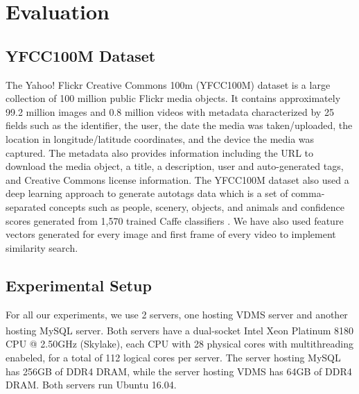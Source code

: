 \section{Evaluation}
\label{eval}

\subsection{YFCC100M Dataset}
\label{dataset}

The Yahoo! Flickr Creative Commons 100m (YFCC100M) dataset is a
large collection of 100 million public Flickr media objects.
It contains approximately 99.2 million images and 0.8 million videos
with metadata characterized by 25 fields such as the identifier,
the user, the date the media was taken/uploaded,
the location in longitude/latitude coordinates,
and the device the media was captured.
The metadata also provides information including the URL to
download the media object, a title, a description, user and
auto-generated tags, and Creative Commons license information.
The YFCC100M dataset also used a deep learning approach to generate
autotags data which is a set of comma-separated concepts such as people,
scenery, objects, and animals and confidence scores
generated from 1,570 trained Caffe classifiers \cite{Thomee_2016}.
We have also used feature vectors generated for every image and first frame
of every video \cite{features} to implement similarity search.

\subsection{Experimental Setup}

For all our experiments, we use 2 servers, one hosting VDMS server and
another hosting MySQL server. Both servers have a dual-socket
Intel\textsuperscript{\textregistered}
Xeon\textsuperscript{\textregistered} Platinum 8180 CPU @ 2.50GHz (Skylake),
each CPU with 28 physical cores with multithreading enabeled,
for a total of 112 logical cores per server.
The server hosting MySQL has 256GB of DDR4 DRAM, while the server hosting VDMS
has 64GB of DDR4 DRAM. Both servers run Ubuntu 16.04.

